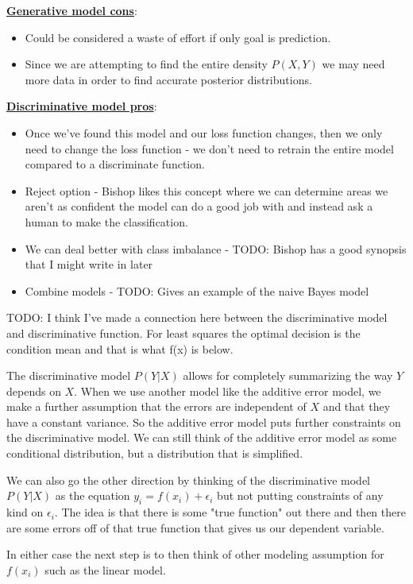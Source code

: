 \documentclass[paper=a4, fontsize=11pt]{scrartcl} %
\numberwithin{equation}{section} %
\numberwithin{figure}{section} %
\numberwithin{table}{section} %
\begin{document}
\noindent \underline{\textbf{Generative model cons}}:
\begin{itemize}
\item Could be considered a waste of effort if only goal is prediction. 
\item Since we are attempting to find the entire density $P(X,Y)$ we may need more data in order to find accurate posterior distributions.
\end{itemize}

\noindent \underline{\textbf{Discriminative model pros}}:
\begin{itemize}
\item Once we've found this model and our loss function changes, then we only need to change the loss function - we don't need to retrain the entire model compared to a discriminate function.
\item Reject option - Bishop likes this concept where we can determine areas we aren't as confident the model can do a good job with and instead ask a human to make the classification.
\item We can deal better with class imbalance - TODO: Bishop has a good synopsis that I might write in later
\item Combine models - TODO: Gives an example of the naive Bayes model
\end{itemize}

TODO: I think I've made a connection here between the discriminative model and discriminative function. For least squares the optimal decision is the condition mean and that is what f(x) is below.

The discriminative model $P(Y|X)$ allows for completely summarizing the way $Y$ depends on $X$. When we use another model like the additive error model, we make a further assumption that the errors are independent of $X$ and that they have a constant variance. So the additive error model puts further constraints on the discriminative model. We can still think of the additive error model as some conditional distribution, but a distribution that is simplified.

We can also go the other direction by thinking of the discriminative model $P(Y|X)$ as the equation $y_i = f(x_i) + \epsilon_i$ but not putting constraints of any kind on $\epsilon_i$. The idea is that there is some "true function" out there and then there are some errors off of that true function that gives us our dependent variable.

In either case the next step is to then think of other modeling assumption for $f(x_i)$ such as the linear model.
\end{document}
